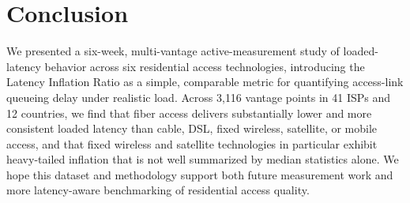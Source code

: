 \section{Conclusion}
\label{sec:conclusion}
We presented a six-week, multi-vantage active-measurement study of loaded-latency
behavior across six residential access technologies, introducing the Latency Inflation
Ratio as a simple, comparable metric for quantifying access-link queueing delay under
realistic load. Across 3{,}116 vantage points in 41 ISPs and 12 countries, we find that
fiber access delivers substantially lower and more consistent loaded latency than cable,
DSL, fixed wireless, satellite, or mobile access, and that fixed wireless and satellite
technologies in particular exhibit heavy-tailed inflation that is not well summarized by
median statistics alone. We hope this dataset and methodology support both future
measurement work and more latency-aware benchmarking of residential access quality.

